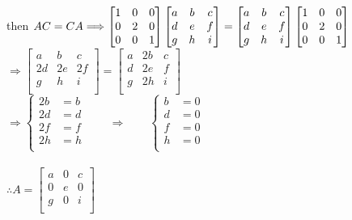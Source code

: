 \documentclass[12pt]{article}
\begin{document}
\hfill\begin{minipage}{\dimexpr\textwidth-10mm}
	then $AC=CA
		\\\\
		\Longrightarrow\begin{bmatrix}
			1 & 0 & 0 \\
			0 & 2 & 0 \\
			0 & 0 & 1 \\
		\end{bmatrix}\begin{bmatrix}
			a & b & c \\
			d & e & f \\
			g & h & i \\
		\end{bmatrix} = \begin{bmatrix}
			a & b & c \\
			d & e & f \\
			g & h & i \\
		\end{bmatrix}\begin{bmatrix}
			1 & 0 & 0 \\
			0 & 2 & 0 \\
			0 & 0 & 1 \\
		\end{bmatrix}$\\
	$\Longrightarrow \begin{bmatrix}
			a  & b  & c  \\
			2d & 2e & 2f \\
			g  & h  & i  \\
		\end{bmatrix}=\begin{bmatrix}
			a & 2b & c \\
			d & 2e & f \\
			g & 2h & i \\
		\end{bmatrix}$\\
	$\Longrightarrow \left\{
		\begin{aligned}
			2b & = b \\
			2d & = d \\
			2f & = f \\
			2h & = h \\
		\end{aligned}
		\right. \qquad \Longrightarrow \qquad \left\{
		\begin{aligned}
			b & = 0    \\
			d & =  0   \\
			f & =   0  \\
			h & =    0 \\
		\end{aligned}\right. $
	\\\\
	$\therefore A = \begin{bmatrix}
			a & 0 & c \\
			0 & e & 0 \\
			g & 0 & i \\
		\end{bmatrix}$
\end{minipage}
\end{document}
